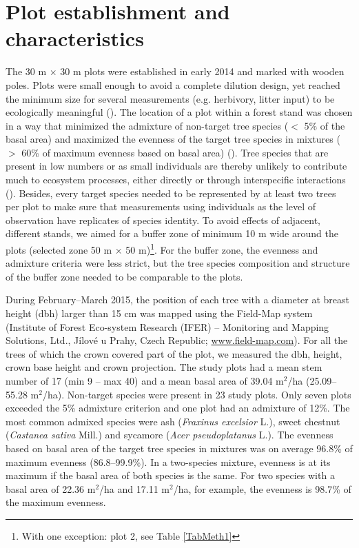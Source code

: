 \documentclass[b5paper,10pt]{book} %
\begin{document}
	\section{Plot establishment and characteristics}

	The 30 m $\times$ 30 m plots were established in early 2014 and marked with wooden poles. Plots were small enough to avoid a complete dilution design, yet reached the minimum size for several measurements (e.g. herbivory, litter input) to be ecologically meaningful (\citealt{Baeten2013}). The location of a plot within a forest stand was chosen in a way that minimized the admixture of non-target tree species ($<$ 5\% of the basal area) and maximized the evenness of the target tree species in mixtures ($>$ 60\% of maximum evenness based on basal area) (\citealt{Baeten2013}). Tree species that are present in low numbers or as small individuals are thereby unlikely to contribute much to ecosystem processes, either directly or through interspecific interactions (\citealt{Mulder2004}). Besides, every target species needed to be represented by at least two trees per plot to make sure that measurements using individuals as the level of observation have replicates of species identity. To avoid effects of adjacent, different stands, we aimed for a buffer zone of minimum 10 m wide around the plots (selected zone 50 m $\times$ 50 m)\footnote{With one exception: plot 2, see Table \ref{TabMeth1}}. For the buffer zone, the evenness and admixture criteria were less strict, but the tree species composition and structure of the buffer zone needed to be comparable to the plots.

	During February--March 2015, the position of each tree with a diameter at breast height (dbh) larger than 15 cm was mapped using the Field-Map system (Institute of Forest Eco-system Research (IFER) -- Monitoring and Mapping Solutions, Ltd., J\'{i}lov\'{e} u Prahy, Czech Republic; \url{www.field-map.com}). For all the trees of which the crown covered part of the plot, we measured the dbh, height, crown base height and crown projection. The study plots had a mean stem number of 17 (min 9 -- max 40) and a mean basal area of 39.04 m$^2$/ha (25.09--55.28 m$^2$/ha). Non-target species were present in 23 study plots. Only seven plots exceeded the 5\% admixture criterion and one plot had an admixture of 12\%. The most common admixed species were ash (\textit{Fraxinus excelsior} L.), sweet chestnut (\textit{Castanea sativa} Mill.) and sycamore (\textit{Acer pseudoplatanus} L.). The evenness based on basal area of the target tree species in mixtures was on average 96.8\% of maximum evenness (86.8--99.9\%). In a two-species mixture, evenness is at its maximum if the basal area of both species is the same. For two species with a basal area of 22.36 m$^2$/ha and 17.11 m$^2$/ha, for example, the evenness is 98.7\% of the maximum evenness.
\end{document}
